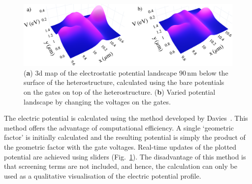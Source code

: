 \begin{figure}[!bht]
 \begin{center}
 \includegraphics[width=1.0\textwidth]{figures/appendix/appendix2_potential.pdf}
 \caption[Non-Self Consistent Electric Potential Calculation]{\label{fig:appx/kwant_pot} 
 (\textbf{a}) 3d map of the electrostatic potential landscape $90\,\mathrm{nm}$ below the surface of the heterostructure, calculated using the bare potentials on the gates on top of the heterostructure. (\textbf{b}) Varied potential landscape by changing the voltages on the gates.}
 \end{center}
\end{figure}



The electric potential is calculated using the method developed by Davies~\cite{Davies1995}. This method offers the advantage of computational efficiency. A single `geometric factor' is initially calculated and the resulting potential is simply the product of the geometric factor with the gate voltages. Real-time updates of the plotted potential are achieved using sliders (Fig.~\ref{fig:appx/kwant_pot}). The disadvantage of this method is that screening terms are not included, and hence, the calculation can only be used as a qualitative visualisation of the electric potential profile.




